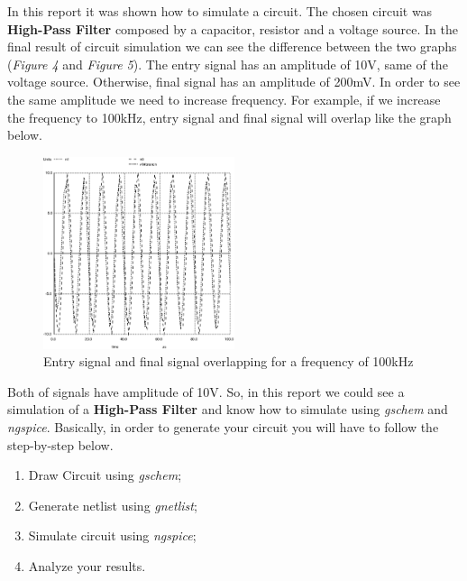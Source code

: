 \documentclass{article}
\begin{document}
In this report it was shown how to simulate a circuit.
The chosen circuit was \textbf{High-Pass Filter} composed by a capacitor, resistor and a voltage source.
In the final result of circuit simulation we can see the difference between the two graphs (\textit{Figure 4} and \textit{Figure 5}). The entry signal has an amplitude of 10V, same of the voltage source. Otherwise, final signal has an amplitude of 200mV.
In order to see the same amplitude we need to increase frequency. For example, if we increase the frequency to 100kHz, entry signal and final signal will overlap like the graph below.

\begin{figure}[H]
\centering
\includegraphics[width=0.5\textwidth, height=0.5\textwidth, angle =0]{014}
\caption{Entry signal and final signal overlapping for a frequency of 100kHz}
\end{figure}

Both of signals have amplitude of 10V. 
\break
So, in this report we could see a simulation of a \textbf{High-Pass Filter} and know how to simulate using \textit{gschem} and \textit{ngspice}. Basically, in order to generate your circuit you will have to follow the step-by-step below.
\break
\begin{enumerate}
\item Draw Circuit using \textit{gschem};
\item Generate netlist using \textit{gnetlist};
\item Simulate circuit using \textit{ngspice};
\item Analyze your results.
\end{enumerate}
\end{document}
